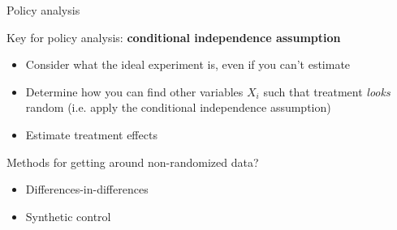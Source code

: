 \begin{frame}{Policy analysis}

Key for policy analysis: \textbf{conditional independence assumption}
\begin{itemize}
    \item Consider what the ideal experiment is, even if you can't estimate
    \item Determine how you can find other variables $X_i$ such that treatment \emph{looks} random (i.e. apply the conditional independence assumption)
    \item Estimate treatment effects
\end{itemize}

\vspace{3ex}
Methods for getting around non-randomized data?
\begin{itemize}
    \item Differences-in-differences
    \item Synthetic control
\end{itemize}
\end{frame}






